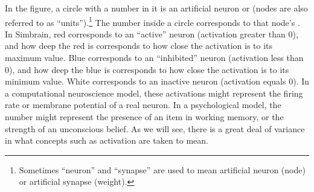 In the figure, a circle with a number in it is an artificial neuron or  (nodes are also referred to as ``units'').\footnote{Sometimes ``neuron'' and ``synapse'' are used to mean artificial neuron (node) or artificial synapse (weight).}  The number inside a circle corresponds to that node's . In Simbrain, red corresponds to an ``active'' neuron (activation greater than 0), and how deep the red is corresponds to how close the activation is to its maximum value. Blue corresponds to an ``inhibited'' neuron (activation less than 0), and how deep the blue is corresponds to how close the activation is to its minimum value. White corresponds to an inactive neuron (activation equals 0). In a computational neuroscience model, these activations might represent the firing rate or membrane potential of a real neuron. In a psychological model, the number might represent the presence of an item in working memory, or the strength of an unconscious belief. As we will see, there is a great deal of variance in what concepts such as activation are taken to mean.
